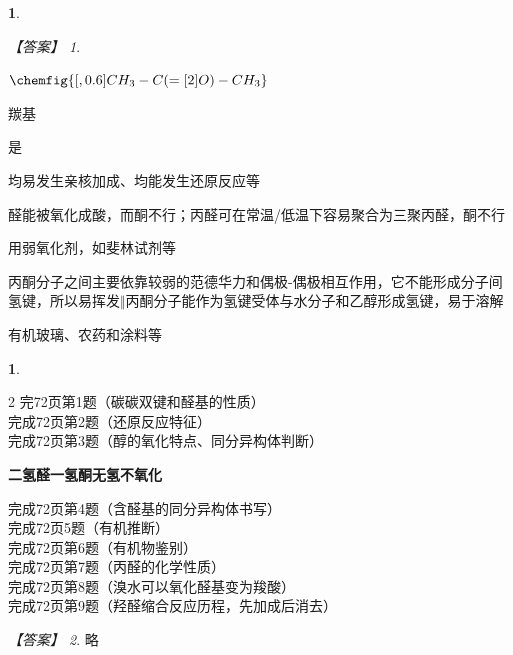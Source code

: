 \documentclass[UTF8, 10pt, a4paper, oneside]{ctexart}
\newcommand{\fs}[1]{{\fangsong #1}}%
\newcommand{\sep}{\hspace{0.5em}\ensuremath{\Vert}\hspace{0.5em}}%
\theoremstyle{definition}
\newtheorem{exercise}{}
\newtheorem{subexercise}{}[exercise]%
\theoremstyle{remark}
\newtheorem*{answer}{【答案】}
\theoremstyle{plain}
\begin{document}
\begin{exercise}
\begin{answer}
\begin{inparaenum}
            \item $\chemfig{[,0.6] CH_3-C(=[2]O)-CH_3}$
            \item 羰基
            \item 是
            \item 均易发生亲核加成、均能发生还原反应等
            \item 醛能被氧化成酸，而酮不行；丙醛可在常温/低温下容易聚合为三聚丙醛，酮不行
            \item 用弱氧化剂，如斐林试剂等
            \item 丙酮分子之间主要依靠较弱的范德华力和偶极-偶极相互作用，它不能形成分子间氢键，所以易挥发\sep 丙酮分子能作为氢键受体与水分子和乙醇形成氢键，易于溶解
            \item 有机玻璃、农药和涂料等
        \end{inparaenum}
    \end{answer}
\end{exercise}
\setcounter{subexercise}{0}
\addtocounter{exercise}{1}
\begin{subexercise}
    \begin{multicols}{2}
        \noindent 完72页第1题（碳碳双键和醛基的性质）\\
        完成72页第2题（还原反应特征）\\
        完成72页第3题（醇的氧化特点、同分异构体判断）
        \begin{flushright}\textbf{二氢醛一氢酮无氢不氧化}\end{flushright}
        完成72页第4题（含醛基的同分异构体书写）\\
        完成72页5题（有机推断）\\
        完成72页第6题（有机物鉴别）\\
        完成72页第7题（丙醛的化学性质）\\
        完成72页第8题（溴水可以氧化醛基变为羧酸）\\
        完成72页第9题（羟醛缩合反应历程，先加成后消去）
    \end{multicols}
    \begin{answer}
        \fs{略}
    \end{answer}
\end{subexercise}
\end{document}
